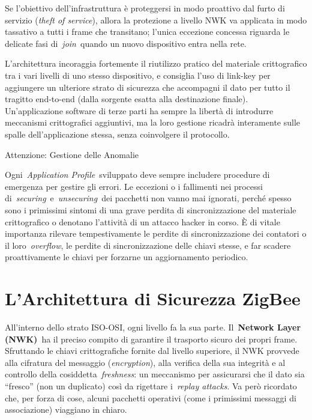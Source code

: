 \documentclass[
  italian,
  openany]{book}
\begin{document}
Se l'obiettivo dell'infrastruttura è proteggersi in modo proattivo dal
furto di servizio (\emph{theft of service}), allora la protezione a
livello NWK va applicata in modo tassativo a tutti i frame che
transitano; l'unica eccezione concessa riguarda le delicate fasi
di~\emph{join}~quando un nuovo dispositivo entra nella rete.

L'architettura incoraggia fortemente il riutilizzo pratico del materiale
crittografico tra i vari livelli di uno stesso dispositivo, e consiglia
l'uso di link-key per aggiungere un ulteriore strato di sicurezza che
accompagni il dato per tutto il tragitto end-to-end (dalla sorgente
esatta alla destinazione finale). Un'applicazione software di terze
parti ha sempre la libertà di introdurre meccanismi crittografici
aggiuntivi, ma la loro gestione ricadrà interamente sulle spalle
dell'applicazione stessa, senza coinvolgere il protocollo.

\begin{calloutwarning}{Attenzione: Gestione delle Anomalie}

Ogni~\emph{Application Profile}~sviluppato deve sempre includere
procedure di emergenza per gestire gli errori. Le eccezioni o i
fallimenti nei processi di~\emph{securing}~e~\emph{unsecuring}~dei
pacchetti non vanno mai ignorati, perché spesso sono i primissimi
sintomi di una grave perdita di sincronizzazione del materiale
crittografico o denotano l'attività di un attacco hacker in corso. È di
vitale importanza rilevare tempestivamente le perdite di
sincronizzazione dei contatori o il loro~\emph{overflow}, le perdite di
sincronizzazione delle chiavi stesse, e far scadere proattivamente le
chiavi per forzarne un aggiornamento periodico.

\end{calloutwarning}

\section{L'Architettura di Sicurezza
ZigBee}\label{larchitettura-di-sicurezza-zigbee}

All'interno dello strato ISO-OSI, ogni livello fa la sua parte.
Il~\textbf{Network Layer (NWK)}~ha il preciso compito di garantire il
trasporto sicuro dei propri frame. Sfruttando le chiavi crittografiche
fornite dal livello superiore, il NWK provvede alla cifratura del
messaggio (\emph{encryption}), alla verifica della sua integrità e al
controllo della cosiddetta~\emph{freshness}: un meccanismo per
assicurarsi che il dato sia ``fresco'' (non un duplicato) così da
rigettare i~\emph{replay attacks}. Va però ricordato che, per forza di
cose, alcuni pacchetti operativi (come i primissimi messaggi di
associazione) viaggiano in chiaro.
\end{document}
